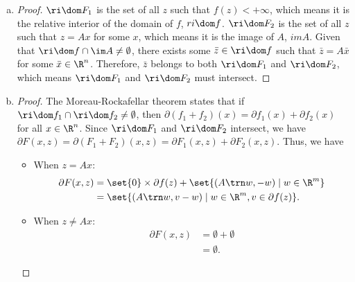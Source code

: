 \documentclass{article}
\theoremstyle{plain}
\theoremstyle{definition}
\theoremstyle{remark}
\begin{document}
\begin{solution}
\begin{enumerate}[(a)]
{\begin{proof}
\begin{itemize}
{\begin{itemize}
                            \item When $z\neq Ax$: In this case, $F_2(x,z)=+\infty$. Thus, the subgradients are empty.
                        \end{itemize}
                    }
                \end{itemize}
            \end{proof}
        }
        \item {
            \begin{proof}
                $\ri\dom F_1$ is the set of all $z$ such that $f(z)<+\infty$, which means it is the relative interior of the domain of $f$, \ie $ri\dom f$. $\ri\dom F_2$ is the set of all $z$ such that $z=Ax$ for some $x$, which means it is the image of $A$, \ie $im A$. Given that $\ri\dom f\cap\im A\neq\emptyset$, there exists some $\bar{z}\in\ri\dom f$ such that $\bar{z}=A\bar{x}$ for some $\bar{x}\in\R^n$. Therefore, $\bar{z}$ belongs to both $\ri\dom F_1$ and $\ri\dom F_2$, which means $\ri\dom F_1$ and $\ri\dom F_2$ must intersect.
            \end{proof}
        }
        \item {
            \begin{proof}
                The Moreau-Rockafellar theorem states that if $\ri\dom f_1\cap\ri\dom f_2\neq\emptyset$, then $\partial(f_1+f_2)(x)=\partial f_1(x)+\partial f_2(x)$ for all $x\in\R^n$. Since $\ri\dom F_1$ and $\ri\dom F_2$ intersect, we have $\partial F(x,z)=\partial(F_1+F_2)(x,z)=\partial F_1(x,z)+\partial F_2(x,z)$. Thus, we have
                \begin{itemize}
                    \item When $z=Ax$: {
                        \begin{align*}
                            \partial F(x,z)&=\set{0}\times\partial f(z)+\set{(A\trn w,-w)\mid w\in\R^m} \\
                            &=\set{(A\trn w,v-w)\mid w\in\R^m, v\in\partial f(z)}.\\
                        \end{align*}
                    }
                    \item When $z\neq Ax$: {
                        \begin{align*}
                            \partial F(x,z)&=\emptyset+\emptyset \\
                            &=\emptyset.
                        \end{align*}
                    }

\end{itemize}
\end{proof}}
\end{enumerate}
\end{solution}
\end{document}
